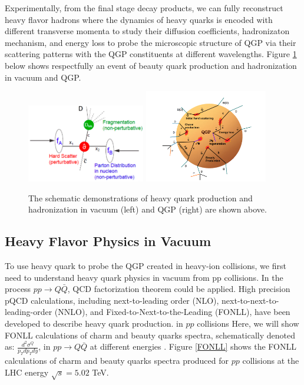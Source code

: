 Experimentally, from the final stage decay products, we can fully reconstruct heavy flavor hadrons where the dynamics of heavy quarks is encoded with different transverse momenta to study their diffusion coefficients, hadronizaton mechanism, and energy loss to probe the microscopic structure of QGP via their scattering patterns with the QGP constituents at different wavelengths. Figure \ref{HQ} below shows respectfully an event of beauty quark production and hadronization in vacuum and QGP.

 \begin{figure}[hbtp]
\begin{center}
\includegraphics[width=0.46\textwidth]{Figures/Chapter1/HQVacuum.png}
\includegraphics[width=0.48\textwidth]{Figures/Chapter1/HQQGP.png}
\caption{The schematic demonstrations of heavy quark production and hadronization in vacuum (left) and QGP (right) are shown above.}
\label{HQ}
\end{center}
\end{figure}   



\subsection{Heavy Flavor Physics in Vacuum}

To use heavy quark to probe the QGP created in heavy-ion collisions, we first need to understand heavy quark physics in vacuum from pp collisions. In the process $pp \rightarrow Q \bar Q$, QCD factorization theorem could be applied. High precision pQCD calculations, including next-to-leading order (NLO), next-to-next-to-leading-order (NNLO), and Fixed-to-Next-to-the-Leading (FONLL), have been developed to describe heavy quark production. in $pp$ collisions Here, we will show FONLL calculations of charm and beauty quarks spectra, schematically denoted as: $\frac{d^2\sigma^Q}{p_T dp_T dy}$, in $pp \rightarrow Q  \bar Q$ at different energies \cite{FONLLRef1,FONLLRef2}. Figure \ref{FONLL} shows the FONLL calculations of charm and beauty quarks spectra produced for $pp$ collisions at the LHC energy $\sqrt s = 5.02$ TeV.

